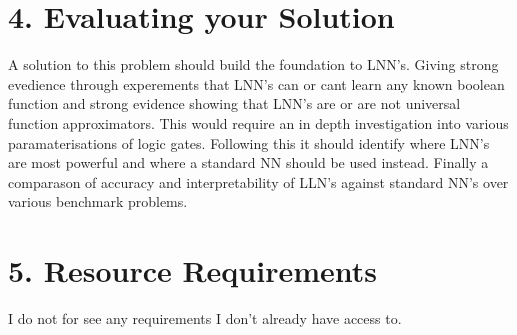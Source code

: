 \documentclass[11pt, a4paper, twoside, openright]{report}
\begin{document}
\section*{4. Evaluating your Solution}

A solution to this problem should build the foundation to LNN's. Giving strong evedience through experements that LNN's can or cant learn any known boolean function and strong evidence showing that LNN's are or are not universal function approximators. This would require an in depth investigation into various paramaterisations of logic gates. Following this it should identify where LNN's are most powerful and where a standard NN should be used instead. Finally a comparason of accuracy and interpretability of LLN's against standard NN's over various benchmark problems.

\section*{5. Resource Requirements}

I do not for see any requirements I don't already have access to.

\backmatter

%


\end{document}
